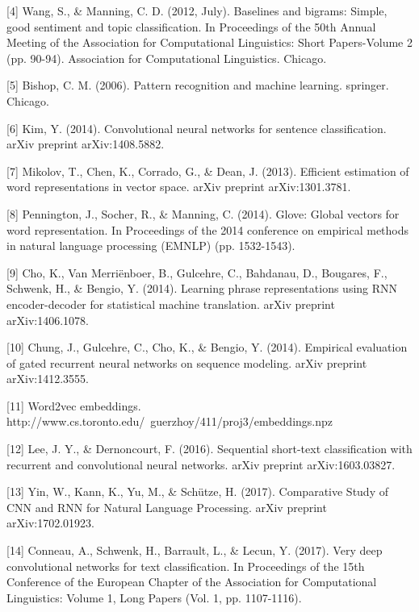 \documentclass{article}
\begin{document}
[4] Wang, S., \& Manning, C. D. (2012, July). Baselines and bigrams: Simple, good sentiment and topic classification. In Proceedings of the 50th Annual Meeting of the Association for Computational Linguistics: Short Papers-Volume 2 (pp. 90-94). Association for Computational Linguistics. Chicago.

[5] Bishop, C. M. (2006). Pattern recognition and machine learning. springer. Chicago.

[6] Kim, Y. (2014). Convolutional neural networks for sentence classification. arXiv preprint arXiv:1408.5882.

[7] Mikolov, T., Chen, K., Corrado, G., \& Dean, J. (2013). Efficient estimation of word representations in vector space. arXiv preprint arXiv:1301.3781.

[8] Pennington, J., Socher, R., \& Manning, C. (2014). Glove: Global vectors for word representation. In Proceedings of the 2014 conference on empirical methods in natural language processing (EMNLP) (pp. 1532-1543).

[9] Cho, K., Van Merriënboer, B., Gulcehre, C., Bahdanau, D., Bougares, F., Schwenk, H., \& Bengio, Y. (2014). Learning phrase representations using RNN encoder-decoder for statistical machine translation. arXiv preprint arXiv:1406.1078.

[10] Chung, J., Gulcehre, C., Cho, K., \& Bengio, Y. (2014). Empirical evaluation of gated recurrent neural networks on sequence modeling. arXiv preprint arXiv:1412.3555.

[11] Word2vec embeddings. http://www.cs.toronto.edu/~guerzhoy/411/proj3/embeddings.npz

[12] Lee, J. Y., \& Dernoncourt, F. (2016). Sequential short-text classification with recurrent and convolutional neural networks. arXiv preprint arXiv:1603.03827.

[13] Yin, W., Kann, K., Yu, M., \& Schütze, H. (2017). Comparative Study of CNN and RNN for Natural Language Processing. arXiv preprint arXiv:1702.01923.

[14] Conneau, A., Schwenk, H., Barrault, L., \& Lecun, Y. (2017). Very deep convolutional networks for text classification. In Proceedings of the 15th Conference of the European Chapter of the Association for Computational Linguistics: Volume 1, Long Papers (Vol. 1, pp. 1107-1116).
\end{document}
